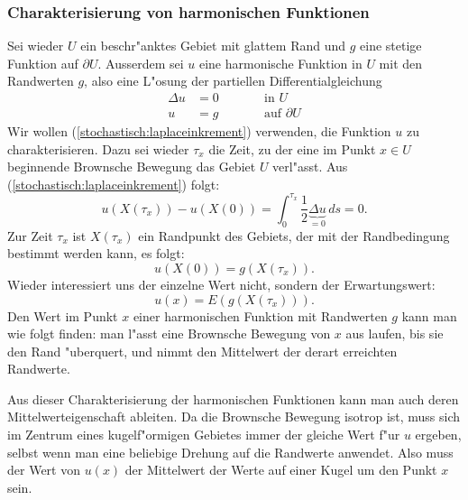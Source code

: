 \subsubsection{Charakterisierung von harmonischen Funktionen}
Sei wieder $U$ ein beschr"anktes Gebiet mit glattem Rand und
$g$ eine stetige Funktion auf $\partial U$.
Ausserdem sei $u$ eine harmonische Funktion in $U$ mit den Randwerten $g$, 
also eine L"osung der partiellen Differentialgleichung
\begin{equation}
\begin{aligned}
\Delta u&=0&\qquad&\text{in $U$}\\
       u&=g&      &\text{auf $\partial U$}
\end{aligned}
\label{stochastisch:harmonisch}
\end{equation}
Wir wollen (\ref{stochastisch:laplaceinkrement}) verwenden, die Funktion
$u$ zu charakterisieren.
Dazu sei wieder $\tau_x$ die Zeit, zu der eine im Punkt $x\in U$ beginnende
Brownsche Bewegung das Gebiet $U$ verl"asst.
Aus (\ref{stochastisch:laplaceinkrement}) folgt:
\[
u(X(\tau_x))-u(X(0))
=
\int_0^{\tau_x} \frac12\underbrace{\Delta u}_{\textstyle=0}\,ds=0.
\]
Zur Zeit $\tau_x$ ist $X(\tau_x)$ ein Randpunkt des Gebiets, der mit
der Randbedingung bestimmt werden kann, es folgt:
\[
u(X(0)) = g(X(\tau_x)).
\]
Wieder interessiert uns der einzelne Wert nicht, sondern der Erwartungswert:
\[
u(x)=E(g(X(\tau_x))).
\]
Den Wert im Punkt $x$ einer harmonischen Funktion mit Randwerten $g$
kann man wie folgt finden: man l"asst eine Brownsche Bewegung von $x$ 
aus laufen, bis sie den Rand "uberquert, und nimmt den Mittelwert
der derart erreichten Randwerte.

Aus dieser Charakterisierung der harmonischen Funktionen kann man
auch deren Mittelwerteigenschaft ableiten. 
Da die Brownsche Bewegung isotrop ist, muss sich im Zentrum
eines kugelf"ormigen Gebietes immer der gleiche Wert f"ur $u$
ergeben, selbst wenn man eine beliebige Drehung auf die Randwerte 
anwendet.
Also muss der Wert von $u(x)$ der Mittelwert der Werte
auf einer Kugel um den Punkt $x$ sein.






